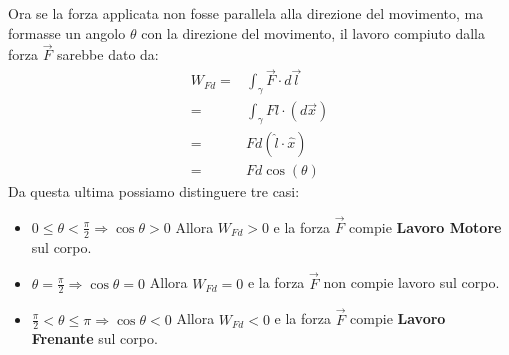         Ora se la forza applicata non fosse parallela alla direzione del movimento, ma formasse un angolo $\theta$ con la direzione del movimento, il lavoro compiuto dalla forza $\vec{F}$ sarebbe dato da:
        $$
            \begin{aligned}
                W_{Fd} =& \int_{\gamma} \vec{F} \cdot d\vec{l}\\
                =& \int_{\gamma} F\hat{l}\cdot (d\vec{x})\\
                =& Fd(\hat{l}\cdot \hat{x})\\
                =& Fd\cos(\theta)
            \end{aligned}
        $$
        Da questa ultima possiamo distinguere tre casi:
        \begin{itemize}
            \item $0\leq \theta < \frac{\pi}2 \Rightarrow \cos \theta > 0$ Allora $W_{Fd} > 0$ e la forza $\vec{F}$ compie \textbf{Lavoro Motore} sul corpo.
            \item $\theta = \frac{\pi}2 \Rightarrow \cos \theta = 0$ Allora $W_{Fd} = 0$ e la forza $\vec{F}$ non compie lavoro sul corpo.
            \item $\frac{\pi}2 < \theta \leq \pi \Rightarrow \cos \theta < 0$ Allora $W_{Fd} < 0$ e la forza $\vec{F}$ compie \textbf{Lavoro Frenante} sul corpo.
        \end{itemize}
